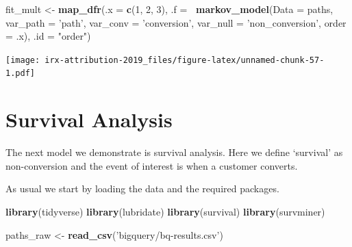\documentclass[]{book}
\newenvironment{Shaded}{\begin{snugshade}}{\end{snugshade}}
\newcommand{\KeywordTok}[1]{\textcolor[rgb]{0.13,0.29,0.53}{\textbf{#1}}}
\newcommand{\DataTypeTok}[1]{\textcolor[rgb]{0.13,0.29,0.53}{#1}}
\newcommand{\DecValTok}[1]{\textcolor[rgb]{0.00,0.00,0.81}{#1}}
\newcommand{\StringTok}[1]{\textcolor[rgb]{0.31,0.60,0.02}{#1}}
\newcommand{\OperatorTok}[1]{\textcolor[rgb]{0.81,0.36,0.00}{\textbf{#1}}}
\newcommand{\NormalTok}[1]{#1}
\begin{document}
\begin{Shaded}
\begin{Highlighting}[]
\NormalTok{fit_mult <-}\StringTok{ }\KeywordTok{map_dfr}\NormalTok{(}\DataTypeTok{.x =} \KeywordTok{c}\NormalTok{(}\DecValTok{1}\NormalTok{, }\DecValTok{2}\NormalTok{, }\DecValTok{3}\NormalTok{), }
                    \DataTypeTok{.f =} \OperatorTok{~}\KeywordTok{markov_model}\NormalTok{(}\DataTypeTok{Data =}\NormalTok{ paths, }
                                       \DataTypeTok{var_path =} \StringTok{'path'}\NormalTok{, }
                                       \DataTypeTok{var_conv =} \StringTok{'conversion'}\NormalTok{, }
                                       \DataTypeTok{var_null =} \StringTok{'non_conversion'}\NormalTok{, }
                                       \DataTypeTok{order =}\NormalTok{ .x), }
                    \DataTypeTok{.id =} \StringTok{"order"}\NormalTok{)}
\end{Highlighting}
\end{Shaded}

\texttt{[image: irx-attribution-2019\_files/figure-latex/unnamed-chunk-57-1.pdf]}

\hypertarget{survival-analysis}{\section{Survival
Analysis}\label{survival-analysis}}

The next model we demonstrate is survival analysis. Here we define
`survival' as non-conversion and the event of interest is when a
customer converts.

As usual we start by loading the data and the required packages.

\begin{Shaded}
\begin{Highlighting}[]
\KeywordTok{library}\NormalTok{(tidyverse)}
\KeywordTok{library}\NormalTok{(lubridate)}
\KeywordTok{library}\NormalTok{(survival)}
\KeywordTok{library}\NormalTok{(survminer)}

\NormalTok{paths_raw <-}\StringTok{ }\KeywordTok{read_csv}\NormalTok{(}\StringTok{'bigquery/bq-results.csv'}\NormalTok{)}
\end{Highlighting}
\end{Shaded}
\end{document}
